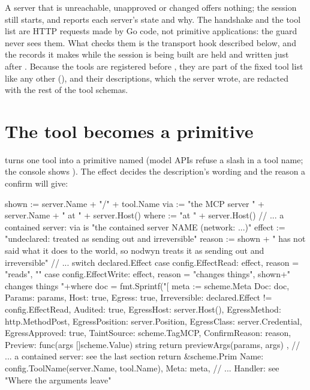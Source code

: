A server that is unreachable, unapproved or changed offers nothing; the
session still starts, and  reports each server's state
and why. The handshake and the tool list are HTTP requests made by Go code,
not primitive applications: the guard never sees them. What checks them is
the transport hook described below, and the  records it
makes while the session is being built are held and written just after
. Because the tools are registered before
, they are part of the fixed tool list like any other
(), and their descriptions, which the server wrote, are redacted
with the rest of the tool schemas.

\section{The tool becomes a primitive}

 turns one tool into a primitive named
 (model APIs refuse a slash in a tool name;
the console shows ). The effect decides the
description's wording and the reason a confirm will give:

\begin{go}
shown := server.Name + "/" + tool.Name
via := "the MCP server " + server.Name + " at " + server.Host()
where := "at " + server.Host()
// ... a contained server: via is "the contained server NAME (network: ...)"
effect := "undeclared: treated as sending out and irreversible"
reason := shown + " has not said what it does to the world, so nodwyn treats it as sending out and irreversible"
// ...
switch declared.Effect {
case config.EffectRead:
    effect, reason = "reads", ""
case config.EffectWrite:
    effect, reason = "changes things", shown+" changes things "+where
}
doc = fmt.Sprintf("[%
meta := scheme.Meta{
    Doc:            doc,
    Params:         params,
    Host:           true,
    Egress:         true,
    Irreversible:   declared.Effect != config.EffectRead,
    Audited:        true,
    EgressHost:     server.Host(),
    EgressMethod:   http.MethodPost,
    EgressPosition: server.Position,
    EgressClass:    server.Credential,
    EgressApproved: true,
    TaintSource:    scheme.TagMCP,
    ConfirmReason:  reason,
    Preview:        func(args []scheme.Value) string { return previewArgs(params, args) },
}
// ... a contained server: see the last section
return &scheme.Prim{
    Name: config.ToolName(server.Name, tool.Name),
    Meta: meta,
    // ... Handler: see "Where the arguments leave"
}
\end{go}

